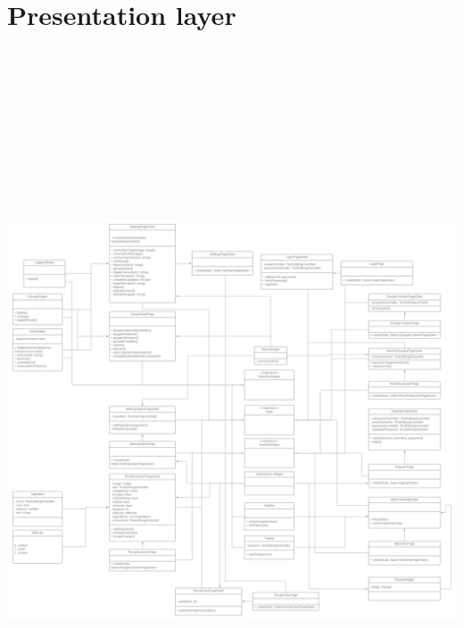 \documentclass[parskip=full]{scrartcl}
\begin{document}
\section{Presentation layer}
    \includegraphics[height=220mm, width = 180mm]{entwurfsheft/images/Presentation-layer/Presentation-Layer.png}
    \newpage
\end{document}
